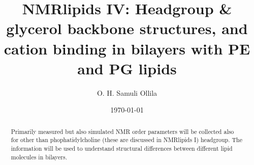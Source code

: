 \documentclass[aps,prl,superscriptaddress,twocolumn]{revtex4}
\begin{document}

\title{NMRlipids IV: Headgroup \& glycerol backbone structures, and cation binding in bilayers with PE and PG lipids} %



\author{O. H. Samuli Ollila}



\date{\today}

\begin{abstract}
  Primarily measured but also simulated NMR order parameters will be collected also for other than phophatidylcholine
  (these are discussed in NMRlipids I) headgroup. The information will be used to understand structural differences between 
  different lipid molecules in bilayers.
\end{abstract}


\maketitle %

\end{document}
